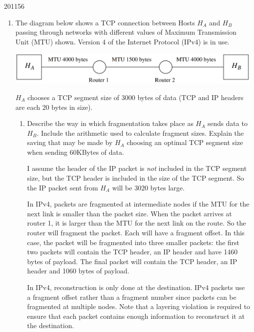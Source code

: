 \documentclass[10pt,\jkfside,a4paper]{article}
\begin{document}
\begin{examquestion}{2011}{5}{6}

\begin{enumerate}

\item The diagram below shows a TCP connection between Hosts $H_A$ and $H_B$
passing through networks with different values of Maximum Transmission Unit
(MTU) shown. Version 4 of the Internet Protocol (IPv4) is in use.

\begin{center}
\includegraphics[width=\textwidth]{router_diagram}
\end{center}

$H_A$ chooses a TCP segment size of 3000 bytes of data (TCP and IP headers
are each 20 bytes in size).

\begin{enumerate}
[label=(\roman*)]

\item Describe the way in which fragmentation takes place as $H_A$ sends data
to $H_B$. Include the arithmetic used to calculate fragment sizes. Explain
the saving that may be made by $H_A$ choosing an optimal TCP segment
size when sending 60KBytes of data.

I assume the header of the IP packet is \textit{not} included in the TCP
segment size, but the TCP header is included in the size of the TCP segment.
So the IP packet sent from $H_A$ will be $3020$ bytes large.

In IPv4, packets are fragmented at intermediate nodes if the MTU for the
next link is smaller than the packet size. When the packet arrives at router
1, it is larger than the MTU for the next link on the route. So the router
will fragment the packet. Each will have a fragment offset. In this case,
the packet will be fragmented into three smaller packets: the first two
packets will contain the TCP header, an IP header and have 1460 bytes of
payload. The final packet will contain the TCP header, an IP header and 1060
bytes of payload.

In IPv4, reconstruction is only done at the destination. IPv4 packets use a
fragment offset rather than a fragment number since packets can be
fragmented at multiple nodes. Note that a layering violation is required to
ensure that each packet contains enough information to reconstruct it at
the destination.


\end{enumerate}
\end{enumerate}
\end{examquestion}
\end{document}
